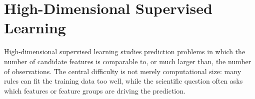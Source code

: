 \section{High-Dimensional Supervised Learning}

High-dimensional supervised learning studies prediction problems in which the number of candidate features is comparable to, or much larger than, the number of observations.  The central difficulty is not merely computational size: many rules can fit the training data too well, while the scientific question often asks which features or feature groups are driving the prediction.




